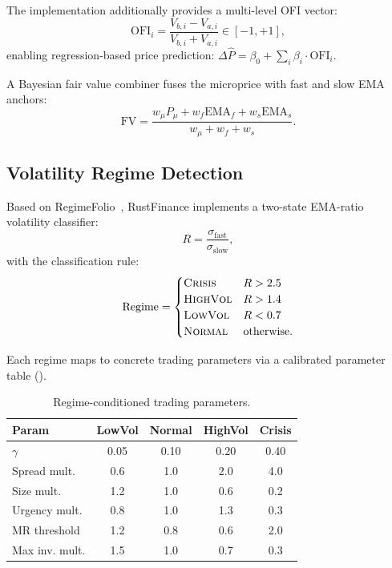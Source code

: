 \documentclass[11pt]{article}
\theoremstyle{definition}
\begin{document}
The implementation additionally provides a multi-level OFI vector:
\begin{equation}
  \text{OFI}_i = \frac{V_{b,i} - V_{a,i}}{V_{b,i} + V_{a,i}}
  \in [-1, +1],
  \label{eq:mlofi}
\end{equation}
enabling regression-based price prediction:
$\Delta \hat{P} = \beta_0 + \sum_i \beta_i \cdot \text{OFI}_i$.

A Bayesian fair value combiner fuses the microprice with fast
and slow EMA anchors:
\begin{equation}
  \text{FV} = \frac{w_\mu P_\mu + w_f \text{EMA}_f + w_s \text{EMA}_s}
              {w_\mu + w_f + w_s}.
  \label{eq:bayesian-fv}
\end{equation}

\subsection{Volatility Regime Detection}
\label{sec:regime}

Based on RegimeFolio~\cite{regimefolio2025}, RustFinance implements
a two-state EMA-ratio volatility classifier:
\begin{equation}
  R = \frac{\sigma_{\text{fast}}}{\sigma_{\text{slow}}},
  \label{eq:vol-ratio}
\end{equation}
with the classification rule:
\[
\text{Regime} = \begin{cases}
  \text{\textsc{Crisis}}   & R > 2.5 \\
  \text{\textsc{HighVol}}  & R > 1.4 \\
  \text{\textsc{LowVol}}   & R < 0.7 \\
  \text{\textsc{Normal}}   & \text{otherwise}.
\end{cases}
\]

Each regime maps to concrete trading parameters via a calibrated
parameter table ().

\begin{table}[H]
\centering
\caption{Regime-conditioned trading parameters.}
\label{tab:regime-params}
\small
\begin{tabular}{@{}lcccc@{}}
\toprule
\textbf{Param} & \textbf{LowVol} & \textbf{Normal} & \textbf{HighVol} & \textbf{Crisis} \\
\midrule
$\gamma$         & 0.05 & 0.10 & 0.20 & 0.40 \\
Spread mult.     & 0.6  & 1.0  & 2.0  & 4.0  \\
Size mult.       & 1.2  & 1.0  & 0.6  & 0.2  \\
Urgency mult.    & 0.8  & 1.0  & 1.3  & 0.3  \\
MR threshold     & 1.2  & 0.8  & 0.6  & 2.0  \\
Max inv. mult.   & 1.5  & 1.0  & 0.7  & 0.3  \\
\bottomrule
\end{tabular}
\end{table}
\end{document}
